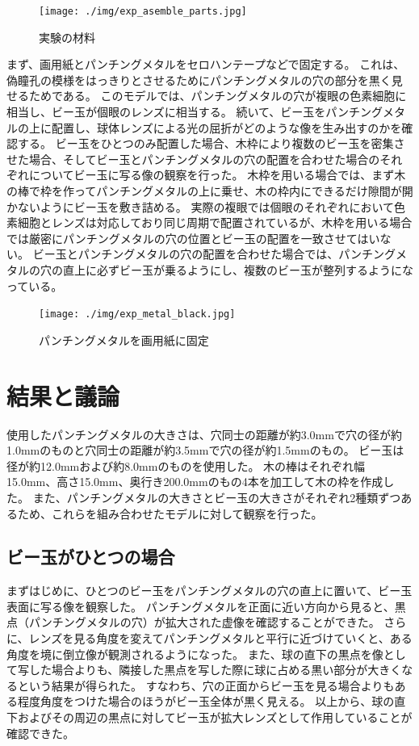 \begin{figure}[htbp]
  \centering
  \texttt{[image: ./img/exp\_asemble\_parts.jpg]}
  \caption{実験の材料}
  \label{FExpparts}
\end{figure}

\noindent
まず、画用紙とパンチングメタルをセロハンテープなどで固定する。
これは、偽瞳孔の模様をはっきりとさせるためにパンチングメタルの穴の部分を黒く見せるためである。
このモデルでは、パンチングメタルの穴が複眼の色素細胞に相当し、ビー玉が個眼のレンズに相当する。
続いて、ビー玉をパンチングメタルの上に配置し、球体レンズによる光の屈折がどのような像を生み出すのかを確認する。
ビー玉をひとつのみ配置した場合、木枠により複数のビー玉を密集させた場合、そしてビー玉とパンチングメタルの穴の配置を合わせた場合のそれぞれについてビー玉に写る像の観察を行った。
木枠を用いる場合では、まず木の棒で枠を作ってパンチングメタルの上に乗せ、木の枠内にできるだけ隙間が開かないようにビー玉を敷き詰める。
実際の複眼では個眼のそれぞれにおいて色素細胞とレンズは対応しており同じ周期で配置されているが、木枠を用いる場合では厳密にパンチングメタルの穴の位置とビー玉の配置を一致させてはいない。
ビー玉とパンチングメタルの穴の配置を合わせた場合では、パンチングメタルの穴の直上に必ずビー玉が乗るようにし、複数のビー玉が整列するようになっている。

\begin{figure}[htbp]
  \centering
  \texttt{[image: ./img/exp\_metal\_black.jpg]}
  \caption{パンチングメタルを画用紙に固定}
  \label{FExpMetalBlack}
\end{figure}


\section{結果と議論}
\label{SExperimentResult}

使用したパンチングメタルの大きさは、穴同士の距離が約3.0mmで穴の径が約1.0mmのものと穴同士の距離が約3.5mmで穴の径が約1.5mmのもの。
ビー玉は径が約12.0mmおよび約8.0mmのものを使用した。
木の棒はそれぞれ幅15.0mm、高さ15.0mm、奥行き200.0mmのもの4本を加工して木の枠を作成した。
また、パンチングメタルの大きさとビー玉の大きさがそれぞれ2種類ずつあるため、これらを組み合わせたモデルに対して観察を行った。

\subsection{ビー玉がひとつの場合}
\label{SSOnemarble}
まずはじめに、ひとつのビー玉をパンチングメタルの穴の直上に置いて、ビー玉表面に写る像を観察した。
パンチングメタルを正面に近い方向から見ると、黒点（パンチングメタルの穴）が拡大された虚像を確認することができた。
さらに、レンズを見る角度を変えてパンチングメタルと平行に近づけていくと、ある角度を境に倒立像が観測されるようになった。
また、球の直下の黒点を像として写した場合よりも、隣接した黒点を写した際に球に占める黒い部分が大きくなるという結果が得られた。
すなわち、穴の正面からビー玉を見る場合よりもある程度角度をつけた場合のほうがビー玉全体が黒く見える。
以上から、球の直下およびその周辺の黒点に対してビー玉が拡大レンズとして作用していることが確認できた。

